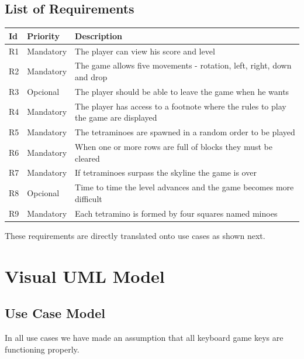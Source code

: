 \documentclass[a4paper]{article}
\begin{document}
\subsection{List of Requirements}
\label{sec:requirements}
\begin{table}[H]
	\centering
	\label{tab:list-of-requirements}
	\begin{tabular}{|l|l|p{9cm}|}
		\hline
		\textbf{Id} & \textbf{Priority} & \textbf{Description} \\ \hline
		R1 & Mandatory         & The player can view his score and level \\ \hline
		R2 & Mandatory         & The game allows five movements - rotation, left, right, down and drop \\ \hline
		R3 & Opcional         & The player should be able to leave the game when he wants \\ \hline
		R4 & Mandatory         & The player has access to a footnote where the rules to play the game are displayed \\ \hline
		R5 & Mandatory         & The tetraminoes are spawned in a random order to be played\\ \hline
		R6 & Mandatory         & When one or more rows are full of blocks they must be cleared \\ \hline
		R7 & Mandatory         & If tetraminoes surpass the skyline the game is over \\ \hline
		R8 & Opcional          & Time to time the level advances and the game becomes more difficult \\ \hline
		R9 & Mandatory        & Each tetramino is formed by four squares named minoes \\ \hline
	\end{tabular}
\end{table}

These requirements are directly translated onto use cases as shown next.
\section{Visual UML Model} 


\subsection{Use Case Model}

In all use cases we have made an assumption that all keyboard game keys are functioning properly.
\end{document}
